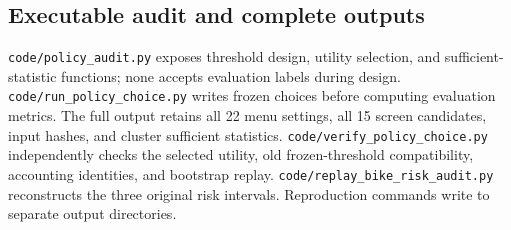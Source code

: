 \subsection{Executable audit and complete outputs}
\texttt{code/policy\_audit.py} exposes threshold design, utility selection, and sufficient-statistic functions; none accepts evaluation labels during design. \texttt{code/run\_policy\_choice.py} writes frozen choices before computing evaluation metrics. The full output retains all 22 menu settings, all 15 screen candidates, input hashes, and cluster sufficient statistics. \texttt{code/verify\_policy\_choice.py} independently checks the selected utility, old frozen-threshold compatibility, accounting identities, and bootstrap replay. \texttt{code/replay\_bike\_risk\_audit.py} reconstructs the three original risk intervals. Reproduction commands write to separate output directories.
